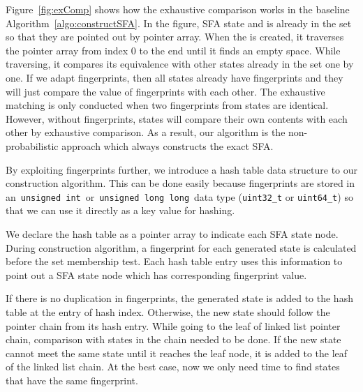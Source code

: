 \documentclass[10pt, conference, compsocconf]{IEEEtran}
\begin{document}
Figure~\ref{fig:exComp} shows how the exhaustive comparison works
in the baseline Algorithm~\ref{algo:constructSFA}. In the figure, SFA state
 and  is already in the set so that they are pointed out by
pointer array. When the  is created, it traverses the pointer array
from index 0 to the end until it finds an empty space. While traversing,
it compares its equivalence with other states already in the set one by one.
\fi
If we adapt fingerprints, then all states already have fingerprints and they will just compare the value of fingerprints with each other. The exhaustive matching is only conducted when two fingerprints from states are identical.
However, without fingerprints, states will compare their own contents with each other by exhaustive comparison.
As a result, our algorithm is the non-probabilistic approach which always constructs 
the exact SFA.

By exploiting fingerprints further, we introduce a hash table data
structure to our construction algorithm. This can be done easily
because fingerprints are stored in an~{\tt unsigned int}~or~{\tt unsigned long long}~data type
({\tt uint32\_t} or {\tt uint64\_t}) so that we can use it directly
as a key value for hashing.

\iffalse
\begin{figure}[htp]
\centering
\texttt{[image: figures/Hashing\_detail]}
\caption{Hash table}
\label{fig:hash}
\end{figure}

Figure~\ref{fig:hash} shows how the hash table works. 
\fi
We declare the hash table as
a pointer array to indicate each SFA state node. During
construction algorithm, a fingerprint for each generated state is
calculated before the set membership test. Each hash table entry uses this
information to point out a SFA state node which has corresponding
fingerprint value.
\iffalse
In the above example, hash table size is 10 and
hash table entry  will point out the first SFA state that has
fingerprint value  as ~mod~.
\fi

If there is no duplication in fingerprints, the generated state is
added to the hash table at the entry of hash index. Otherwise,
the new state should follow the pointer chain from its hash entry.
While going to the leaf of linked list pointer chain, comparison with
states in the chain needed to be done. If the new state cannot meet
the same state until it reaches the leaf node, it is added to the leaf
of the linked list chain. At the best case, now we only need  time
to find states that have the same fingerprint.
\end{document}
